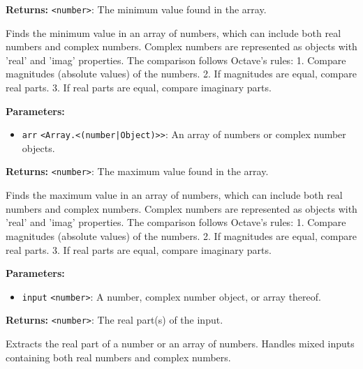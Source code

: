 \documentclass[12pt,a4paper]{article}
\begin{document}
\noindent \textbf{Returns:} \texttt{<number>}: The minimum value found in the array.

\noindent Finds the minimum value in an array of numbers, which can include both real numbers and complex numbers.
Complex numbers are represented as objects with 'real' and 'imag' properties.
The comparison follows Octave's rules:
1. Compare magnitudes (absolute values) of the numbers.
2. If magnitudes are equal, compare real parts.
3. If real parts are equal, compare imaginary parts.

\vspace{5mm}
\noindent {}


\noindent \textbf{Parameters:}
\begin{itemize}
  \item \texttt{arr} \texttt{<Array.<(number|Object)>>}: An array of numbers or complex number objects.
\end{itemize}

\noindent \textbf{Returns:} \texttt{<number>}: The maximum value found in the array.

\noindent Finds the maximum value in an array of numbers, which can include both real numbers and complex numbers.
Complex numbers are represented as objects with 'real' and 'imag' properties.
The comparison follows Octave's rules:
1. Compare magnitudes (absolute values) of the numbers.
2. If magnitudes are equal, compare real parts.
3. If real parts are equal, compare imaginary parts.

\vspace{5mm}
\noindent {}


\noindent \textbf{Parameters:}
\begin{itemize}
  \item \texttt{input} \texttt{<number>}: A number, complex number object, or array thereof.
\end{itemize}

\noindent \textbf{Returns:} \texttt{<number>}: The real part(s) of the input.

\noindent Extracts the real part of a number or an array of numbers.
Handles mixed inputs containing both real numbers and complex numbers.

\vspace{5mm}
\noindent {}
\end{document}
